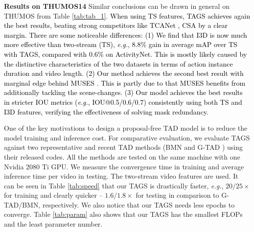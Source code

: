 \documentclass[runningheads]{llncs}
\newcommand{\eg}{\textit{e.g.}}
\newcommand{\shortmodelname}{TAGS}
\begin{document}
\noindent \textbf{Results on THUMOS14 } 
Similar conclusions can be drawn in general on THUMOS from Table \ref{tab:tab_1}. 
\textcolor{black}{When using TS features, {\shortmodelname} achieves again the best results, beating strong competitors like TCANet \cite{wang2021temporal}, CSA \cite{sridhar2021class} by a clear margin. There are some noticeable differences:
(1) We find that I3D is now much more effective than two-stream (TS),
\eg, 8.8\% gain in average mAP over TS with {\shortmodelname}, compared with 0.6\% on ActivityNet. This is mostly likely caused by the distinctive characteristics of the two datasets in terms of action instance duration and video length.
(2) Our method achieves the second best result with marginal edge behind MUSES \cite{liu2021multi}.
This is partly due to that MUSES benefits from additionally tackling the scene-changes. \textcolor{black}{(3) Our model achieves the best results in stricter IOU metrics (\eg, IOU@0.5/0.6/0.7) consistently using both TS and I3D features, verifying the effectiveness of solving mask redundancy.}
}




One of the key motivations to design a proposal-free TAD model is to reduce the model training and inference cost.
For comparative evaluation, we evaluate
{\shortmodelname} against two representative and recent TAD methods (BMN \cite{lin2019bmn} and G-TAD \cite{xu2020g})
using their released codes.
All the methods are tested on the same machine with one Nvidia 2080 Ti GPU.
We measure the convergence time in training
and average inference time per video in testing.
{The two-stream video features are used.}
It can be seen in Table \ref{tab:speed} that our {\shortmodelname}
is drastically faster, \eg, $20/25\times$ for training and clearly quicker -- $1.6/1.8\times$ for testing in comparison to G-TAD/BMN, respectively.
We also notice that our {\shortmodelname} needs less epochs to converge.
Table \ref{tab:param} also shows that our {\shortmodelname} has the smallest FLOPs and the least parameter number.
\end{document}
